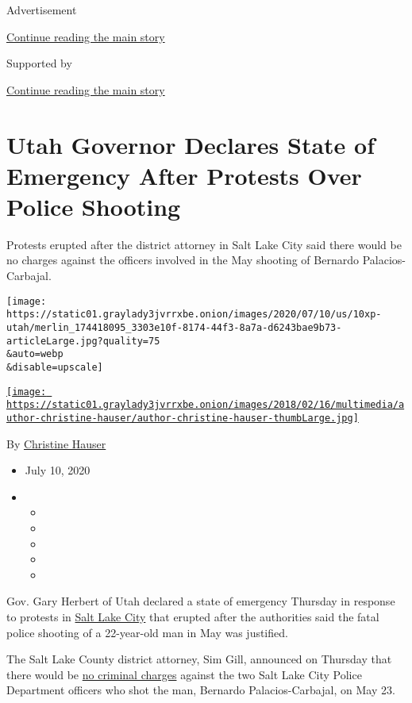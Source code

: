 Advertisement

\protect\hyperlink{after-top}{Continue reading the main story}

Supported by

\protect\hyperlink{after-sponsor}{Continue reading the main story}

\hypertarget{utah-governor-declares-state-of-emergency-after-protests-over-police-shooting}{%
\section{Utah Governor Declares State of Emergency After Protests Over
Police
Shooting}\label{utah-governor-declares-state-of-emergency-after-protests-over-police-shooting}}

Protests erupted after the district attorney in Salt Lake City said
there would be no charges against the officers involved in the May
shooting of Bernardo Palacios-Carbajal.

\texttt{[image: https://static01.graylady3jvrrxbe.onion/images/2020/07/10/us/10xp-utah/merlin\_174418095\_3303e10f-8174-44f3-8a7a-d6243bae9b73-articleLarge.jpg?quality=75\\\&auto=webp\\\&disable=upscale]}

\href{https://www.nytimes3xbfgragh.onion/by/christine-hauser}{\texttt{[image: https://static01.graylady3jvrrxbe.onion/images/2018/02/16/multimedia/author-christine-hauser/author-christine-hauser-thumbLarge.jpg]}}

By
\href{https://www.nytimes3xbfgragh.onion/by/christine-hauser}{Christine
Hauser}

\begin{itemize}
\item
  July 10, 2020
\item
  \begin{itemize}
  \item
  \item
  \item
  \item
  \item
  \end{itemize}
\end{itemize}

Gov. Gary Herbert of Utah declared a state of emergency Thursday in
response to protests in
\href{https://www.nytimes3xbfgragh.onion/2020/09/08/us/salt-lake-city-autism-shooting.html}{Salt
Lake City} that erupted after the authorities said the fatal police
shooting of a 22-year-old man in May was justified.

The Salt Lake County district attorney, Sim Gill, announced on Thursday
that there would be
\href{https://slco.org/district-attorney/press-releases/palacios-carbajal-oici/}{no
criminal charges} against the two Salt Lake City Police Department
officers who shot the man, Bernardo Palacios-Carbajal, on May 23.

